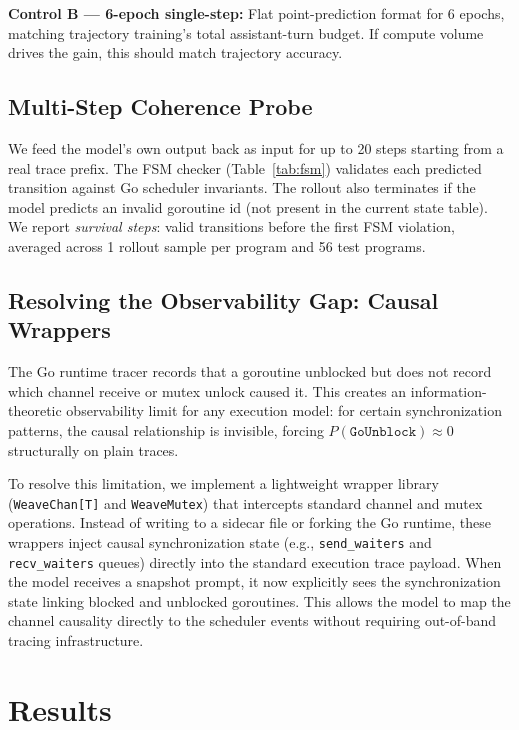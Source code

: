 \documentclass[10pt,conference]{IEEEtran}
\newcommand{\eunblock}{\texttt{GoUnblock}}
\begin{document}
\textbf{Control B — 6-epoch single-step:} Flat point-prediction format
for 6 epochs, matching trajectory training's total assistant-turn
budget. If compute volume drives the gain, this should match
trajectory accuracy.

\subsection{Multi-Step Coherence Probe}\label{sec:rollout}

We feed the model's own output back as input for up to 20 steps
starting from a real trace prefix.
The FSM checker (Table~\ref{tab:fsm}) validates each predicted
transition against Go scheduler invariants.
The rollout also terminates if the model predicts an invalid goroutine
id (not present in the current state table).
We report \emph{survival steps}: valid transitions before the first
FSM violation, averaged across 1 rollout sample per program and
56 test programs.

\subsection{Resolving the Observability Gap: Causal Wrappers}\label{sec:wrappers}

The Go runtime tracer records that a goroutine unblocked but does not record which channel receive or mutex unlock caused it. This creates an information-theoretic observability limit for any execution model: for certain synchronization patterns, the causal relationship is invisible, forcing $P(\eunblock) \approx 0$ structurally on plain traces. 

To resolve this limitation, we implement a lightweight wrapper library (\texttt{WeaveChan[T]} and \texttt{WeaveMutex}) that intercepts standard channel and mutex operations. Instead of writing to a sidecar file or forking the Go runtime, these wrappers inject causal synchronization state (e.g., \texttt{send\_waiters} and \texttt{recv\_waiters} queues) directly into the standard execution trace payload. When the model receives a snapshot prompt, it now explicitly sees the synchronization state linking blocked and unblocked goroutines. This allows the model to map the channel causality directly to the scheduler events without requiring out-of-band tracing infrastructure.

\section{Results}\label{sec:results}
\end{document}
